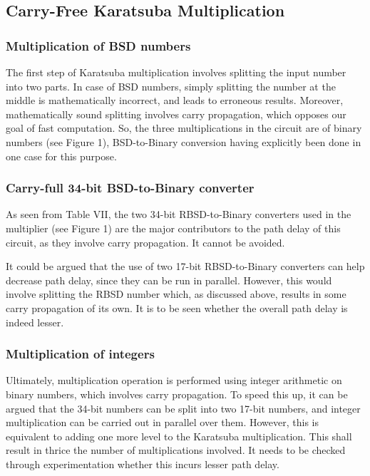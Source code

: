 \documentclass[conference]{IEEEtran}
\begin{document}
\subsection{Carry-Free Karatsuba Multiplication}

\subsubsection{Multiplication of BSD numbers}

The first step of Karatsuba multiplication involves splitting the input number into two parts. In case of BSD numbers, simply splitting the number at the middle is mathematically incorrect, and leads to erroneous results. Moreover, mathematically sound splitting involves carry propagation, which opposes our goal of fast computation. So, the three multiplications in the circuit are of binary numbers (see Figure 1), BSD-to-Binary conversion having explicitly been done in one case for this purpose.

\subsubsection{Carry-full 34-bit BSD-to-Binary converter}

As seen from Table VII, the two 34-bit RBSD-to-Binary converters used in the multiplier (see Figure 1) are the major contributors to the path delay of this circuit, as they involve carry propagation. It cannot be avoided.

It could be argued that the use of two 17-bit RBSD-to-Binary converters can help decrease path delay, since they can be run in parallel. However, this would involve splitting the RBSD number which, as discussed above, results in some carry propagation of its own. It is to be seen whether the overall path delay is indeed lesser.

\subsubsection{Multiplication of integers}

Ultimately, multiplication operation is performed using integer arithmetic on binary numbers, which involves carry propagation. To speed this up, it can be argued that the 34-bit numbers can be split into two 17-bit numbers, and integer multiplication can be carried out in parallel over them. However, this is equivalent to adding one more level to the Karatsuba multiplication. This shall result in thrice the number of multiplications involved. It needs to be checked through experimentation whether this incurs lesser path delay.
\end{document}
